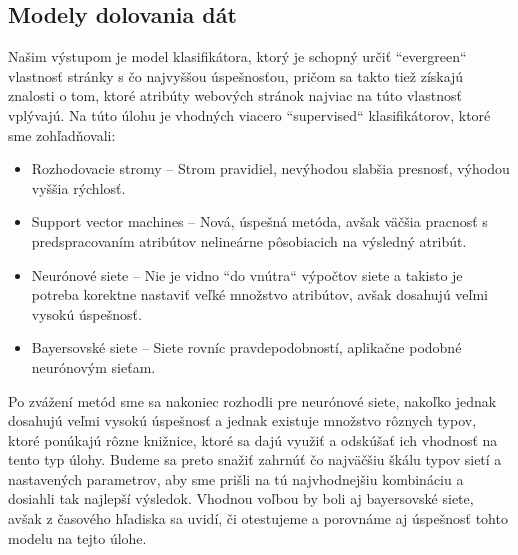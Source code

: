 \documentclass{iitsrc}
\begin{document}
\begin{multicols}{2}
\section{Modely dolovania dát}
%
Našim výstupom je model klasifikátora, ktorý je schopný určiť ``evergreen`` vlastnosť stránky s čo najvyššou úspešnosťou, pričom sa takto tiež získajú znalosti o tom, ktoré atribúty webových stránok najviac na túto vlastnosť vplývajú. 
%
Na túto úlohu je vhodných viacero ``supervised`` klasifikátorov, ktoré sme zohľadňovali:
%
\begin{itemize}
	\item Rozhodovacie stromy – Strom pravidiel, nevýhodou slabšia presnosť, výhodou vyššia rýchlosť.
	\item Support vector machines – Nová, úspešná metóda, avšak väčšia pracnosť s predspracovaním atribútov nelineárne pôsobiacich na výsledný atribút.
	\item Neurónové siete – Nie je vidno ``do vnútra`` výpočtov siete a takisto je potreba korektne nastaviť veľké množstvo atribútov, avšak dosahujú veľmi vysokú úspešnosť.
	\item Bayersovské siete – Siete rovníc pravdepodobností, aplikačne podobné neurónovým sieťam.
\end{itemize}
%
Po zvážení metód sme sa nakoniec rozhodli pre neurónové siete, nakoľko jednak dosahujú veľmi vysokú úspešnosť a jednak existuje množstvo rôznych typov, ktoré ponúkajú rôzne knižnice, ktoré sa dajú využiť a odskúšať ich vhodnosť na tento typ úlohy. Budeme sa preto snažiť zahrnúť čo najväčšiu škálu typov sietí a nastavených parametrov, aby sme prišli na tú najvhodnejšiu kombináciu a dosiahli tak najlepší výsledok. Vhodnou voľbou by boli aj bayersovské siete, avšak z časového hľadiska sa uvidí, či otestujeme a porovnáme aj úspešnosť tohto modelu na tejto úlohe.


\end{multicols}
\end{document}

